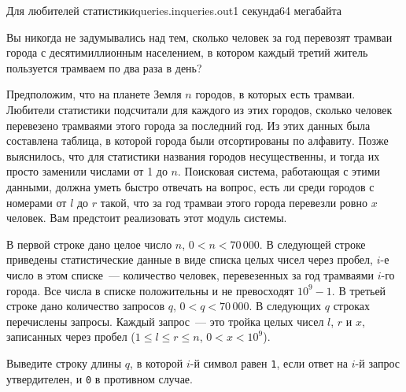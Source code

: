 \begin{problem}{Для любителей статистики}{queries.in}{queries.out}{1 секунда}{64 мегабайта}


Вы никогда не задумывались над тем, сколько человек за год перевозят 
трамваи города с десятимиллионным населением, в котором каждый третий житель
пользуется трамваем по два раза в день?

Предположим, что на планете Земля $n$ городов, в которых есть трамваи.
Любители статистики подсчитали для каждого из этих городов, сколько человек
перевезено трамваями этого города за последний год. Из этих данных была составлена 
таблица, в которой города были отсортированы по алфавиту. Позже выяснилось, что
для статистики названия городов несущественны, и тогда их просто заменили числами
от 1 до $n$. Поисковая система, работающая с этими данными,
должна уметь быстро отвечать на вопрос, есть ли среди городов с номерами от $l$ до $r$
такой, что за год трамваи этого города перевезли ровно $x$ человек.
Вам предстоит реализовать этот модуль системы.

\InputFile
В первой строке дано целое число $n$, $0 < n < 70\,000$. 
В следующей строке приведены статистические данные в виде
списка целых чисел через пробел, $i$-е число в этом списке~--- 
количество человек, перевезенных за год трамваями $i$-го города. 
Все числа в списке положительны и не превосходят $10^9-1$. 
В третьей строке дано количество запросов $q$, $0 < q < 70\,000$.
В следующих $q$ строках перечислены запросы. Каждый запрос~--- это тройка целых чисел
$l$, $r$ и $x$, записанных через пробел
($1 \leqslant l \leqslant r \leqslant n$,  $0 < x < 10^9$).

\OutputFile
Выведите строку длины $q$, в которой 
$i$-й символ равен \texttt{1}, если ответ на $i$-й запрос утвердителен, 
и \texttt{0} в противном случае.

\Example
\begin{example}
%
\end{example}

\end{problem}
